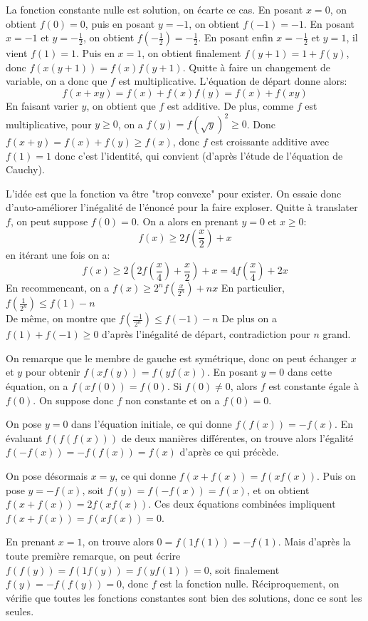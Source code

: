 \begin{sol}
La fonction constante nulle est solution, on écarte ce cas. En posant $x=0$, on obtient $f(0)=0$, puis en posant $y=-1$, on obtient $f(-1)=-1$. En posant $x=-1$ et $y=-\displaystyle\frac{1}{2}$, on obtient $f\left(-\displaystyle\frac{1}{2}\right)=-\displaystyle\frac{1}{2}$. En posant enfin $x=-\displaystyle\frac{1}{2}$ et $y=1$, il vient $f(1)=1$. Puis en $x=1$, on obtient finalement $f(y+1)=1+f(y)$, donc $f(x(y+1))=f(x)f(y+1)$. Quitte à faire un changement de variable, on a donc que $f$ est multiplicative. L'équation de départ donne alors:
$$f(x+xy)=f(x)+f(x)f(y)=f(x)+f(xy)$$
En faisant varier $y$, on obtient que $f$ est additive. De plus, comme $f$ est multiplicative, pour $y\ge 0$, on a $f(y)=f(\sqrt{y})^2\ge 0$. Donc $f(x+y)=f(x)+f(y)\ge f(x)$, donc $f$ est croissante additive avec $f(1)=1$ donc c'est l'identité, qui convient  (d'après l'étude de l'équation de Cauchy).
\end{sol}


\begin{sol}
L'idée est que la fonction va être "trop convexe" pour exister. On essaie donc d'auto-améliorer l'inégalité de l'énoncé pour la faire exploser.
Quitte à translater $f$, on peut suppose $f(0)=0$. On a alors en prenant $y=0$ et $x\ge 0$:
$$f(x)\ge 2f\left(\frac{x}{2}\right)+x$$
en itérant une fois on a:
$$f(x)\ge 2\left(2f\left(\frac{x}{4}\right)+\frac{x}{2}\right)+x=4f\left(\frac{x}{4}\right)+2x$$
En recommencant, on a $f(x)\ge 2^n f\left(\displaystyle\frac{x}{2^n}\right)+nx$
En particulier, $f\left(\displaystyle\frac{1}{2^n}\right)\le f(1)-n$\\
De même, on montre que $f\left(\displaystyle\frac{-1}{2^n}\right)\le f(-1)-n$
De plus on a $f(1)+f(-1)\ge 0$ d'après l'inégalité de départ, contradiction pour $n$ grand.
\end{sol}

\begin{sol}
On remarque que le membre de gauche est symétrique, donc on peut échanger $x$ et $y$ pour obtenir $f(xf(y))=f(yf(x))$. En posant $y=0$ dans cette équation, on a $f(xf(0))=f(0)$. Si $f(0)\neq 0$, alors $f$ est constante égale à $f(0)$. On suppose donc $f$ non constante et on a $f(0)=0$.

On pose $y=0$ dans l'équation initiale, ce qui donne $f(f(x))=-f(x)$. En évaluant $f(f(f(x)))$ de deux manières différentes, on trouve alors l'égalité $f(-f(x))=-f(f(x))=f(x)$ d'après ce qui précède.

On pose désormais $x=y$, ce qui donne $f(x+f(x))=f(xf(x))$. Puis on pose $y=-f(x)$, soit $f(y)=f(-f(x))=f(x)$, et on obtient $f(x+f(x))=2f(xf(x))$. Ces deux équations combinées impliquent $f(x+f(x))=f(xf(x))=0$.

En prenant $x=1$, on trouve alors $0=f(1f(1))=-f(1)$. Mais d'après la toute première remarque, on peut écrire $f(f(y))=f(1f(y))=f(yf(1))=0$, soit finalement $f(y)=-f(f(y))=0$, donc $f$ est la fonction nulle. Réciproquement, on vérifie que toutes les fonctions constantes sont bien des solutions, donc ce sont les seules.
\end{sol}


